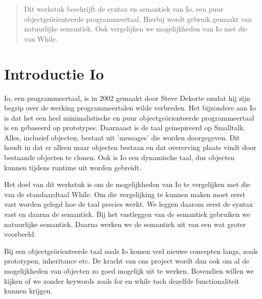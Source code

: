 \documentclass[12pt]{article}
\begin{document}
\maketitle


\begin{abstract}
Dit werkstuk beschrijft de syntax en semantiek van Io, een puur objectge\"orienteerde programmeertaal.
Hierbij wordt gebruik gemaakt van natuurlijke semantiek.
Ook vergelijken we mogelijkheden van Io met die van While.
\end{abstract}

\section{Introductie Io}
Io, een programmeertaal, is in 2002 gemaakt door Steve Dekorte omdat hij zijn begrip over de werking programmeertalen wilde verbreden.
Het bijzondere aan Io is dat het een heel minimalistische en puur objectge\"orienteerde programmeertaal is en gebaseerd op prototypes. Daarnaast is de taal geinspireerd op Smalltalk. Alles, inclusief objecten, bestaat uit 'messages' die worden doorgegeven. %
Dit houdt in dat er alleen maar objecten bestaan en dat overerving plaats vindt door bestaande objecten te clonen.
Ook is Io een dynamische taal, dus objecten kunnen tijdens runtime uit worden gebreidt.

Het doel van dit werkstuk is om de mogelijkheden van Io te vergelijken met die van de standaardtaal While.
Om die vergelijking te kunnen maken moet eerst vast worden gelegd hoe de taal precies werkt.
We leggen daarom eerst de syntax vast en daarna de semantiek. Bij het vastleggen van de semantiek gebruiken we natuurlijke semantiek.
Daarna werken we de semantiek uit van een wat groter voorbeeld.

Bij een objectge\"orienteerde taal zoals Io komen veel nieuwe concepten langs, zoals prototypen, inheritance etc. De kracht van ons project wordt dan ook om al de mogelijkheden van objecten 
zo goed mogelijk uit te werken.  Bovendien willen we kijken of we zonder keywords zoals for en while toch dezelfde functionaliteit kunnen krijgen.
\end{document}
